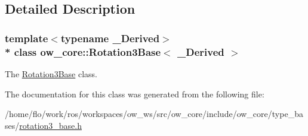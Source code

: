\subsection{Detailed Description}
\subsubsection*{template$<$typename \+\_\+\+Derived$>$\\*
class ow\+\_\+core\+::\+Rotation3\+Base$<$ \+\_\+\+Derived $>$}

The \hyperlink{classow__core_1_1Rotation3Base}{Rotation3\+Base} class. 

The documentation for this class was generated from the following file\+:\begin{DoxyCompactItemize}
\item 
/home/flo/work/ros/workspaces/ow\+\_\+ws/src/ow\+\_\+core/include/ow\+\_\+core/type\+\_\+bases/\hyperlink{rotation3__base_8h}{rotation3\+\_\+base.\+h}\end{DoxyCompactItemize}
